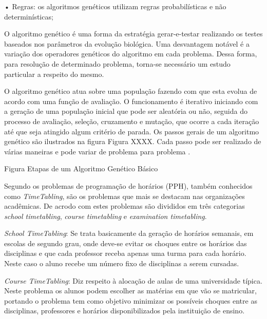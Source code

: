 •  Regras: os algoritmos genéticos utilizam regras probabilísticas e não determinísticas; \par

O algoritmo genético é uma forma da estratégia gerar-e-testar realizando os testes baseados nos parâmetros da evolução biológica. Uma desvantagem notável é a variação dos operadores genéticos do algoritmo em cada problema. Dessa forma, para resolução de determinado problema, torna-se necessário um estudo particular a respeito do mesmo. \par

O algoritmo genético atua sobre uma população fazendo com que esta evolua de acordo com uma função de avaliação. O funcionamento é iterativo iniciando com a geração de uma população inicial que pode ser aleatória ou não, seguida do processo de avaliação, seleção, cruzamento e mutação, que ocorre a cada iteração até que seja atingido algum critério de parada. Os passos gerais de um algoritmo genético são ilustrados na figura 
Figura XXXX. Cada passo pode ser realizado de várias maneiras e pode variar de problema para problema \cite{timoteo2005desenvolvimento}.\par 

Figura Etapas de um Algoritmo Genético Básico 


Segundo \cite{kripkasimulated} os problemas de programação de horários (PPH), também conhecidos como \textit{TimeTabling}, são os problemas que mais se destacam nas organizações acadêmicas. De acrodo com \cite{schaerf1999survey} estes problemas são divididos em três categorias \textit{school timetabling}, \textit{course timetabling} e \textit{examination timetabling}.\par

\textit{School TimeTabling}: Se trata basicamente da geração de horários semanais, em escolas de segundo grau, onde deve-se evitar os choques entre os horários das disciplinas e que cada professor receba apenas uma turma para cada horário. Neste caso o aluno recebe um número fixo de disciplinas a serem cursadas.\par

\textit{Course TimeTabling}: Diz respeito à alocação de aulas de uma universidade típica. Neste problema os alunos podem escolher as matérias em que vão se matricular, portando o problema tem como objetivo minimizar os possíveis choques entre as disciplinas, professores e horários disponibilizados pela instituição de ensino.\par

